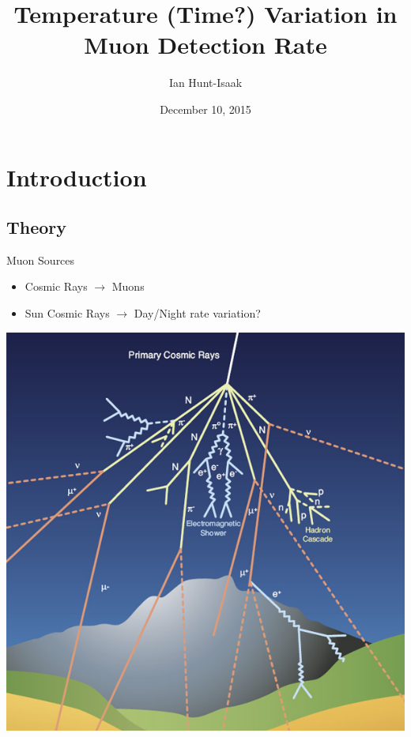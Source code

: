\documentclass{beamer}
\title[Muon Rate - Phys 314]{Temperature (Time?) Variation in Muon Detection Rate}
\author[Ian Hunt-Isaak]{Ian Hunt-Isaak}
\institute[Oberlin College]{Partner: Corina Miner}
\date{December 10, 2015}
\begin{document}
\begin{frame}
  \titlepage
\end{frame}


\section{Introduction}
\subsection{Theory}
\begin{frame}{Muon Sources}
\begin{itemize}
	\item Cosmic Rays $\to$ Muons
	\item Sun Cosmic Rays $\to$ Day/Night rate variation?
\end{itemize}
\begin{center}
\includegraphics[scale=.25]{../Figures/cosmic_ray.jpg}
\hspace{20pt}

\end{center}
\end{frame}
\end{document}
